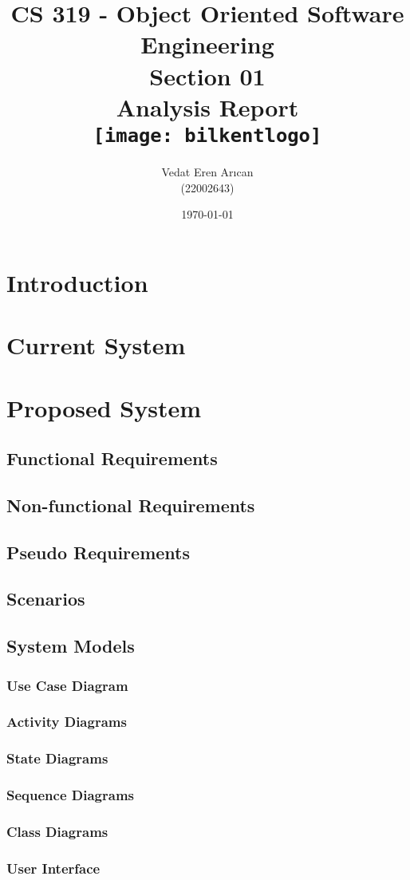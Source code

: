 \documentclass[a4paper, 12pt, titlepage]{article}
\title{
    {CS 319 - Object Oriented Software Engineering}\\
    {\large Section 01}\\
    {\large Analysis Report}\\
    {\vspace{10mm}\texttt{[image: bilkentlogo]}}
}
\author{Vedat Eren Arıcan\\ (22002643)}
\date{\today}
\begin{document}
  \maketitle
  \tableofcontents
  \pagebreak
  
  \section{Introduction}
  
  \section{Current System}
  
  \section{Proposed System}
  
  \subsection{Functional Requirements}
  
  \subsection{Non-functional Requirements}
  
  \subsection{Pseudo Requirements} %
  
  \subsection{Scenarios}
  
  \subsection{System Models}
  
  \subsubsection{Use Case Diagram}
  
  
  
  \subsubsection{Activity Diagrams}
  
  \subsubsection{State Diagrams}
  
  \subsubsection{Sequence Diagrams}
  
  \subsubsection{Class Diagrams}
  
  \subsubsection{User Interface}
  
\end{document}
